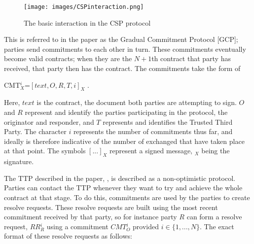 \documentclass{l4proj}
\begin{document}



\begin{figure}[ht!]
\centering
\texttt{[image: images/CSPinteraction.png]}
\caption{The basic interaction in the CSP protocol}
\label{csp}
\end{figure}

This is referred to in the paper as the Gradual Commitment Protocol [GCP]; parties send commitments to each other in turn. These commitments eventually become valid contracts; when they are the $N+1$th contract that party has received, that party then has the contract. The commitments take the form of\\

\centerline{CMT${_{X}^{i}}$=$[text, O, R, T, i]_X $ .}

Here, $text$ is the contract, the document both parties are attempting to sign. $O$ and $R$ represent and identify the parties participating in the protocol, the originator and responder, and $T$ represents and identifies the Trusted Third Party. The character $i$ represents the number of commitments thus far, and ideally is therefore indicative of the number of exchanged that have taken place at that point. The symbols $[...]_X$ represent a signed message, $_X$ being the signature.

The TTP described in the paper, \cite{ASW09}, is described as a non-optimistic protocol. Parties can contact the TTP whenever they want to try and achieve the whole contract at that stage. To do this, commitments are used by the parties to create resolve requests. These resolve requests are built using the most recent commitment received by that party, so for instance party $R$ can form a resolve request, $RR{_{R}^{i}}$ using a commitment $CMT{_{O}^i}$ provided $i \in \{1,...,N\}$. The exact format of these resolve requests as follows:\\
\end{document}
